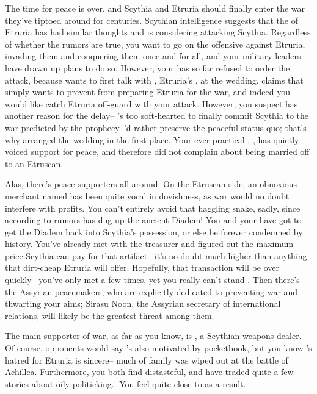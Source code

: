\documentclass[char]{Kos}
\begin{document}
The time for peace is over, and Scythia and Etruria should finally enter the war they've tiptoed around for centuries. Scythian intelligence suggests that the \cEtruriaKing{\monarch} of Etruria has had similar thoughts and is considering attacking Scythia. Regardless of whether the rumors are true, you want to go on the offensive against Etruria, invading them and conquering them once and for all, and your military leaders have drawn up plans to do so. However, your \cScythiaKing{\spouse} has so far refused to order the attack, because \cScythiaKing{\they} wants to first talk with \cEtruriaKing{}, Etruria's \cEtruriaKing{\monarch}, at the wedding. \cScythiaKing{\They} claims that \cScythiaKing{\they} simply wants to prevent \cEtruriaKing{} from preparing Etruria for the war, and indeed you would like catch Etruria off-guard with your attack. However, you suspect \cScythiaKing{} has another reason for the delay-- \cScythiaKing{\they}'s too soft-hearted to finally commit Scythia to the war predicted by the prophecy. \cScythiaKing{\They}'d rather preserve the peaceful status quo; that's why \cScythiaKing{\they} arranged the wedding in the first place. Your ever-practical \cBride{\offspring}, \cBride{}, has quietly voiced \cBride{\their} support for peace, and \cBride{\they} therefore did not complain about being married off to an Etruscan. 

Alas, there's peace-supporters all around. On the Etruscan side, an obnoxious merchant named \cMerchant{} has been quite vocal in \cMerchant{\their} dovishness, as war would no doubt interfere with \cMerchant{\their} profits. You can't entirely avoid that haggling snake, sadly, since according to rumors \cMerchant{\they} has dug up the ancient Diadem! You and your \cScythiaKing{\spouse} have got to get the Diadem back into Scythia's possession, or else be forever condemned by history. You've already met with the treasurer and figured out the maximum price Scythia can pay \cMerchant{} for that artifact-- it's no doubt much higher than anything that dirt-cheap Etruria will offer. Hopefully, that transaction will be over quickly-- you've only met \cMerchant{} a few times, yet you really can't stand \cMerchant{\them}. Then there's the Assyrian peacemakers, who are explicitly dedicated to preventing war and thwarting your aims; Sirasu Noon, the Assyrian secretary of international relations, will likely be the greatest threat among them.

The main supporter of war, as far as you know, is \cArmsDealer{}, a Scythian weapons dealer. Of course, \cArmsDealer{\their} opponents would say \cArmsDealer{\they}'s also motivated by \cArmsDealer{\their} pocketbook, but you know \cArmsDealer{}'s hatred for Etruria is sincere-- much of \cArmsDealer{\their} family was wiped out at the battle of Achillea. Furthermore, you both find \cMerchant{} distasteful, and have traded quite a few stories about \cMerchant{\their} oily politicking.. You feel quite close to \cArmsDealer{} as a result. 
\end{document}
